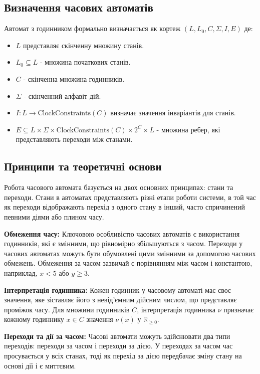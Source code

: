 \documentclass[12pt,a4paper]{article}
\begin{document}
\subsection{Визначення часових автоматів}
Автомат з годинником формально визначається як кортеж \( (L, L_0, C, \Sigma, I, E) \) де:
\begin{itemize}
\item \( L \) представляє скінченну множину станів.
\item \( L_0 \subseteq L \) - множина початкових станів.
    \item \( C \) - скінченна множина годинників.
    \item \( \Sigma \) - скінченний алфавіт дій.
    \item \( I: L \rightarrow \text{ClockConstraints}(C) \) визначає значення інваріантів для станів.
\item \( E \subseteq L \times \Sigma \times \text{ClockConstraints}(C) \times 2^C \times L \) - множина ребер, які представляють переходи між станами.
\end{itemize}

\subsection{Принципи та теоретичні основи}
Робота часового автомата базується на двох основних принципах: стани та переходи. Стани в автоматах представляють різні етапи роботи системи, в той час як переходи відображають перехід з одного стану в інший, часто спричинений певними діями або плином часу.

\textbf{Обмеження часу:} Ключовою особливістю часових автоматів є використання годинників, які є змінними, що рівномірно збільшуються з часом. Переходи у часових автоматах можуть бути обумовлені цими змінними за допомогою часових обмежень. Обмеження за часом зазвичай є порівнянням між часом і константою, наприклад, \( x < 5 \) або \( y \geq 3 \).

\textbf{Інтерпретація годинника:} Кожен годинник у часовому автоматі має своє значення, яке зіставляє його з невід'ємним дійсним числом, що представляє проміжок часу. Для множини годинників \( C \), інтерпретація годинника \( \nu \) призначає кожному годиннику \( x \in C \) значення \( \nu(x) \) у \( \mathbb{R}_{\geq 0} \).

\textbf{Переходи та дії за часом:} Часові автомати можуть здійснювати два типи переходів: переходи за часом і переходи за дією. У переходах за часом час просувається у всіх станах, тоді як перехід за дією передбачає зміну стану на основі дії і є миттєвим.
\end{document}
